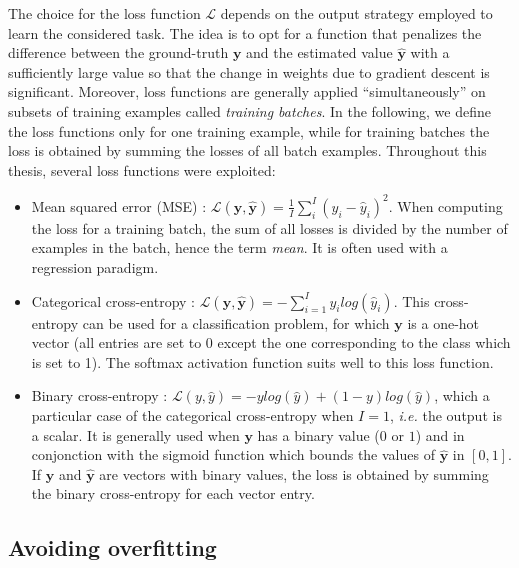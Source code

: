 The choice for the loss function $\mathcal{L}$ depends on the output strategy employed to learn the considered task. The idea is to opt for a function that penalizes the difference between the ground-truth $\mathbf{y}$ and the estimated value $\hat{\mathbf{y}}$ with a sufficiently large value so that the change in weights due to gradient descent is significant. Moreover, loss functions are generally applied ``simultaneously'' on subsets of training examples called \textit{training batches}. In the following, we define the loss functions only for one training example, while for training batches the loss is obtained by summing the losses of all batch examples. Throughout this thesis, several loss functions were exploited:
\begin{itemize}
    \item Mean squared error (MSE) : $\mathcal{L}(\mathbf{y},\hat{\mathbf{y}}) =  \frac{1}{I} \sum_i^I (y_i - \hat{y}_i)^2$. When computing the loss for a training batch, the sum of all losses is divided by the number of examples in the batch, hence the term \textit{mean}. It is often used with a regression paradigm.
    
    \item Categorical cross-entropy : $\mathcal{L}(\mathbf{y},\hat{\mathbf{y}}) = - \sum_{i=1}^I y_i log(\hat{y}_i)$. This cross-entropy can be used for a classification problem, for which $\mathbf{y}$ is a one-hot vector (all entries are set to 0 except the one corresponding to the class which is set to 1). The softmax activation function suits well to this loss function.
    
    \item Binary cross-entropy : $\mathcal{L}(y,\hat{y}) = - y log(\hat{y}) + (1-y) log(\hat{y})$, which a particular case of the categorical cross-entropy when $I=1$, \emph{i.e.} the output is a scalar. It is generally used when $\mathbf{y}$ has a binary value ($0$ or $1$) and in conjonction with the sigmoid function which bounds the values of $\hat{\mathbf{y}}$ in $[0,1]$. If $\mathbf{y}$ and $\hat{\mathbf{y}}$ are vectors with binary values, the loss is obtained by summing the binary cross-entropy for each vector entry.
    
\end{itemize}

\subsection{Avoiding overfitting}

